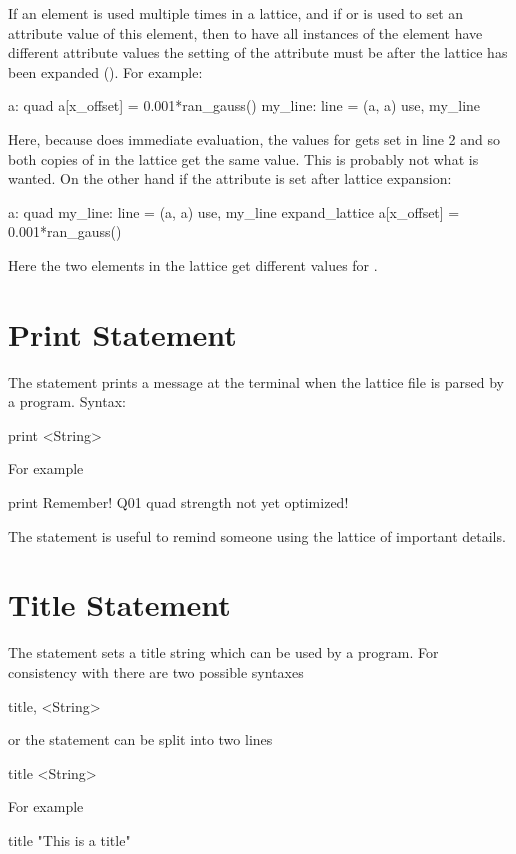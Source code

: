 {{
If an element is used multiple times in a lattice, and if  or
 is used to set an attribute value of this element, then
to have all instances of the element have different attribute values
the setting of the attribute must be after the lattice has been
expanded (). For example:
\begin{example}
  a: quad 
  a[x_offset] = 0.001*ran_gauss()
  my_line: line = (a, a)
  use, my_line
\end{example}
Here, because \bmad does immediate evaluation, the 
values for  gets set in line 2 and so both copies of  in
the lattice get the same value. This is probably not what is wanted.
On the other hand if the attribute is set after lattice expansion:
\begin{example}
  a: quad 
  my_line: line = (a, a)
  use, my_line
  expand_lattice
  a[x_offset] = 0.001*ran_gauss()
\end{example}
Here the two  elements in the lattice get different values for
.

\section{Print Statement}
\label{s:print}

The  statement prints a message at the terminal when the 
lattice file is parsed by a program. Syntax:
\begin{example}
  print <String>
\end{example}
For example
\begin{example}
  print Remember! Q01 quad strength not yet optimized!
\end{example}
The  statement is useful to remind someone using the lattice of important details.

\section{Title Statement}

The  statement sets a title string which can be used by a program. 
For consistency with \mad there are two possible syntaxes
\begin{example}
  title, <String>
\end{example}
or the statement can be split into two lines
\begin{example}
  title
  <String>
\end{example}
For example
\begin{example}
  title
  "This is a title"
\end{example}

}}
